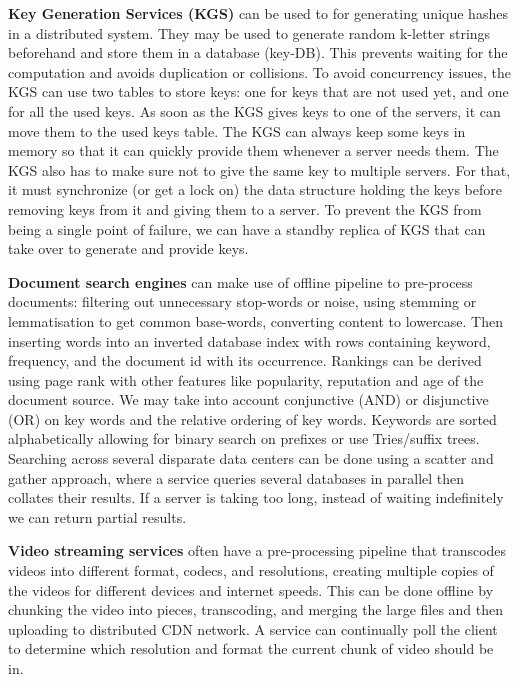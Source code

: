 \documentclass{article}
\begin{document}
    \textbf{Key Generation Services (KGS)} can be used to for generating unique hashes in a distributed system. They may be used to generate random k-letter strings beforehand and store them in a database (key-DB). This prevents waiting for the computation and avoids duplication or collisions. To avoid concurrency issues, the KGS can use two tables to store keys: one for keys that are not used yet, and one for all the used keys. As soon as the KGS gives keys to one of the servers, it can move them to the used keys table. The KGS can always keep some keys in memory so that it can quickly provide them whenever a server needs them. The KGS also has to make sure not to give the same key to multiple servers. For that, it must synchronize (or get a lock on) the data structure holding the keys before removing keys from it and giving them to a server. To prevent the KGS from being a single point of failure, we can have a standby replica of KGS that can take over to generate and provide keys.
    
    \textbf{Document search engines} can make use of offline pipeline to pre-process documents: filtering out unnecessary stop-words or noise, using stemming or lemmatisation to get common base-words, converting content to lowercase. Then inserting words into an inverted database index with rows containing keyword, frequency, and the document id with its occurrence. Rankings can be derived using page rank with other features like popularity, reputation and age of the document source. We may take into account conjunctive (AND) or disjunctive (OR) on key words and the relative ordering of key words. Keywords are sorted alphabetically allowing for binary search on prefixes or use Tries/suffix trees. Searching across several disparate data centers can be done using a scatter and gather approach, where a service queries several databases in parallel then collates their results. If a server is taking too long, instead of waiting indefinitely we can return partial results.
    
    \textbf{Video streaming services} often have a pre-processing pipeline that transcodes videos into different format, codecs, and resolutions, creating multiple copies of the videos for different devices and internet speeds. This can be done offline by chunking the video into pieces, transcoding, and merging the large files and then uploading to distributed CDN network. A service can continually poll the client to determine which resolution and format the current chunk of video should be in. 
    
\end{document}
